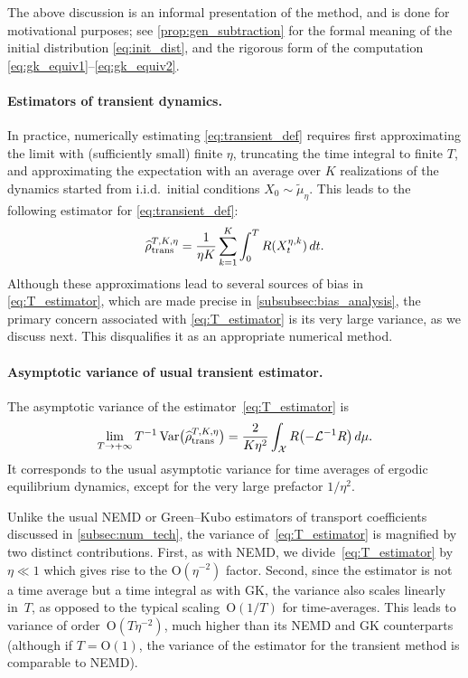 \documentclass[11pt]{article}
\renewcommand{\L}{\mathcal{L}}
\newcommand{\bigO}{\mathrm{O}}
\DeclareMathOperator{\Var}{Var}
\DeclarePairedDelimiter\paren{\lparen}{\rparen}
\theoremstyle{definition}
\let\oldparagraph=\paragraph
\renewcommand\paragraph[1]{\oldparagraph{#1.}}
\newcommand{\psip}{\widetilde{\mu}_\eta}
\newcommand{\estTmp}{\widehat{\rho}}
\newcommand{\Test}{\estTmp^{T,K,\eta}_{\rm trans}} %
\begin{document}
The above discussion is an informal presentation of the method, and is done for motivational purposes; see \cref{prop:gen_subtraction} for the formal meaning of the initial distribution \eqref{eq:init_dist}, and the rigorous form of the computation \eqref{eq:gk_equiv1}--\eqref{eq:gk_equiv2}.  

\paragraph{Estimators of transient dynamics} In practice, numerically estimating \eqref{eq:transient_def} requires first approximating the limit with (sufficiently small) finite $\eta$, truncating the time integral to finite $T$, and approximating the expectation with an average over $K$ realizations of the dynamics started from i.i.d.\ initial conditions $X_0\sim\psip$. This leads to the following estimator for \eqref{eq:transient_def}:
\begin{equation}
	\Test = \frac{1}{\eta K}\sum_{k=1}^K \int_0^T R(X_t^{\eta,k}) \, dt.	
	\label{eq:T_estimator}
\end{equation}
Although these approximations lead to several sources of bias in \eqref{eq:T_estimator}, which are made precise in \cref{subsubsec:bias_analysis}, the primary concern associated with \eqref{eq:T_estimator} is its very large variance, as we discuss next. This disqualifies it as an appropriate numerical method.

\paragraph{Asymptotic variance of usual transient estimator} The asymptotic variance of the estimator~\eqref{eq:T_estimator} is
\begin{equation}
    \notag
	\lim_{T\to+\infty} T^{-1}\Var\bigl(\Test\bigr) = \frac{2}{K\eta^2}\int_\mathcal{X} R\paren*{-\L^{-1} R} \, d\mu.
	\label{eq:asym_var_transient}
\end{equation}
It corresponds to the usual asymptotic variance for time averages of ergodic equilibrium dynamics, except for the very large prefactor $1/\eta^2$. 


Unlike the usual NEMD or Green--Kubo estimators of transport coefficients discussed in \cref{subsec:num_tech}, the variance of~\eqref{eq:T_estimator} is magnified by two distinct contributions. First, as with NEMD, we divide~\eqref{eq:T_estimator} by $\eta\ll 1$ which gives rise to the $\bigO(\eta^{-2})$ factor. Second, since the estimator is not a time average but a time integral as with GK, the variance also scales linearly in~$T$, as opposed to the typical scaling~$\bigO(1/T)$ for time-averages. This leads to variance of order~$\bigO(T\eta^{-2})$, much higher than its NEMD and GK counterparts (although if $T=\bigO(1)$, the variance of the estimator for the transient method is comparable to NEMD).
\end{document}
